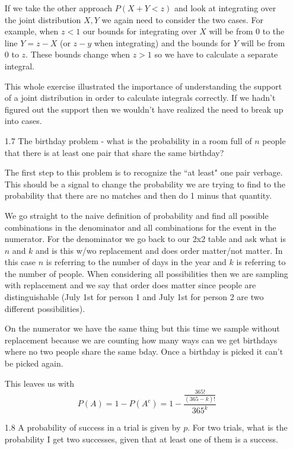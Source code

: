 \begin{enumerate}
If we take the other approach $P(X+Y<z)$ and look at integrating over the joint distribution $X,Y$ we again need to consider the two cases. For example, when $z<1$ our bounds for integrating over $X$ will be from 0 to the line $Y=z - X$ (or $z-y$ when integrating) and the bounds for $Y$ will be from 0 to $z$. These bounds change when $z>1$ so we have to calculate a separate integral.

This whole exercise illustrated the importance of understanding the support of a joint distribution in order to calculate integrals correctly. If we hadn't figured out the support then we wouldn't have realized the need to break up into cases.

\item[1.7] The birthday problem - what is the probability in a room full of $n$ people that there is at least one pair that share the same birthday?

The first step to this problem is to recognize the ``at least" one pair verbage. This should be a signal to change the probability we are trying to find to the probability that there are no matches and then do 1 minus that quantity. 

We go straight to the naive definition of probability and find all possible combinations in the denominator and all combinations for the event in the numerator. For the denominator we go back to our 2x2 table and ask what is $n$ and $k$ and is this w/wo replacement and does order matter/not matter. In this case $n$ is referring to the number of days in the year and $k$ is referring to the number of people. When considering all possibilities then we are sampling with replacement and we say that order does matter since people are distinguishable (July 1st for person 1 and July 1st for person 2 are two different possibilities). 

On the numerator we have the same thing but this time we sample without replacement because we are counting how many ways can we get birthdays where no two people share the same bday. Once a birthday is picked it can't be picked again.

This leaves us with
\begin{equation}
P(A) = 1 - P(A^{c}) = 1 - \frac{\frac{365!}{(365 - k)!}}{365^k}
\end{equation}

\item[1.8] A probability of success in a trial is given by $p$. For two trials, what is the probability I get two successes, given that at least one of them is a success. 


\end{enumerate}
